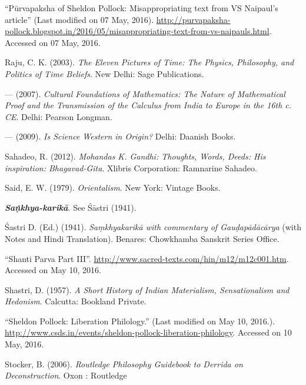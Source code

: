 \begin{thebibliography}{99}
``Pūrvapaksha of Sheldon Pollock: Misappropriating text from VS Naipaul's article'' (Last modified on 07 May, 2016). \url{http://purvapaksha-pollock.blogspot.in/2016/05/misappropriating-text-from-vs-naipauls.html}. Accessed on 07 May, 2016.

Raju, C. K. (2003). {\sl The Eleven Pictures of Time: The Physics, Philosophy, and Politics of Time Beliefs}. New Delhi: Sage Publications.

--- (2007). {\sl Cultural Foundations of Mathematics: The Nature of Mathematical Proof and the Transmission of the Calculus from India to Europe in the 16th c. CE}. Delhi: Pearson Longman.

--- (2009). {\sl Is Science Western in Origin?} Delhi: Daanish Books.

Sahadeo, R. (2012). {\sl Mohandas K. Gandhi: Thoughts, Words, Deeds: His inspiration: Bhagavad-Gita}. Xlibris Corporation: Ramnarine Sahadeo.

Said, E. W. (1979). {\sl Orientalism}. New York: Vintage Books.

{\sl\bfseries Saṇ̇khya-karikā}. See Śāstri (1941).

Śastri D. (Ed.) (1941). {\sl Saṃkhyakarikā with commentary of Gauḍapādācārya} (with Notes and Hindi Translation). Benares: Chowkhamba Sanskrit Series Office.

``Shanti Parva Part III''. \url{http://www.sacred-texts.com/hin/m12/m12c001.htm}. Accessed on May 10, 2016.

Shastri, D. (1957). {\sl A Short History of Indian Materialism, Sensationalism and Hedonism}. Calcutta: Bookland Private.

``Sheldon Pollock: Liberation Philology.'' (Last modified on May 10, 2016.). \url{http://www.csds.in/events/sheldon-pollock-liberation-philology}. Accessed on 10 May, 2016.

Stocker, B. (2006). {\sl Routledge Philosophy Guidebook to Derrida on Deconstruction}. Oxon : Routledge

\end{thebibliography}

\theendnotes
\label{chapter\thechapter:end}
